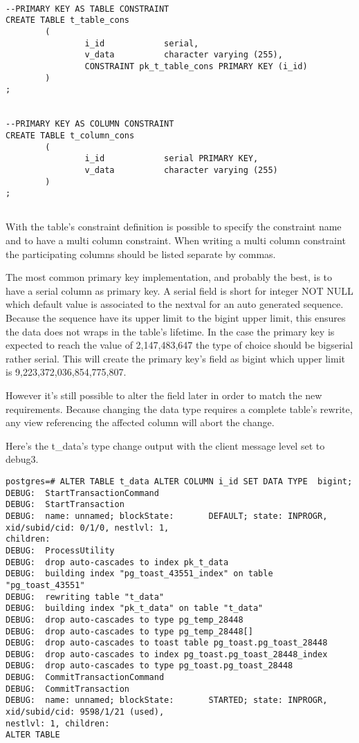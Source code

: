 \begin{lstlisting}[style=pgsql]

--PRIMARY KEY AS TABLE CONSTRAINT
CREATE TABLE t_table_cons
        (
                i_id            serial,
                v_data          character varying (255),
                CONSTRAINT pk_t_table_cons PRIMARY KEY (i_id)
        )
;


--PRIMARY KEY AS COLUMN CONSTRAINT
CREATE TABLE t_column_cons
        (
                i_id            serial PRIMARY KEY,
                v_data          character varying (255)
        )
;
 

\end{lstlisting}

With the table's constraint definition is possible to specify the constraint name and to have a 
multi column constraint. When writing a multi column constraint the participating columns should be 
listed separate by commas.\newline

The most common primary key implementation, and probably the best, is to have a serial column as 
primary key. A serial field is short for integer NOT NULL which default value is associated to the 
nextval for an auto generated sequence. Because the sequence have its upper limit to the bigint 
upper limit, this ensures the data does not wraps in the table's lifetime. In the case the primary 
key is expected to reach the value of 2,147,483,647 the type of choice should be bigserial rather 
serial. This will create the primary key's field as bigint which upper limit is 
9,223,372,036,854,775,807.\newline

However it's still possible to alter the field later in order to match the new requirements. 
Because changing the data type requires a complete table's rewrite, any view referencing the 
affected column will abort the change. \newline 

Here's the t\_data's type change output with the client message level set to debug3.

\begin{lstlisting}[style=pgsql]
postgres=# ALTER TABLE t_data ALTER COLUMN i_id SET DATA TYPE  bigint; 
DEBUG:  StartTransactionCommand
DEBUG:  StartTransaction
DEBUG:  name: unnamed; blockState:       DEFAULT; state: INPROGR, xid/subid/cid: 0/1/0, nestlvl: 1, 
children: 
DEBUG:  ProcessUtility
DEBUG:  drop auto-cascades to index pk_t_data
DEBUG:  building index "pg_toast_43551_index" on table "pg_toast_43551"
DEBUG:  rewriting table "t_data"
DEBUG:  building index "pk_t_data" on table "t_data"
DEBUG:  drop auto-cascades to type pg_temp_28448
DEBUG:  drop auto-cascades to type pg_temp_28448[]
DEBUG:  drop auto-cascades to toast table pg_toast.pg_toast_28448
DEBUG:  drop auto-cascades to index pg_toast.pg_toast_28448_index
DEBUG:  drop auto-cascades to type pg_toast.pg_toast_28448
DEBUG:  CommitTransactionCommand
DEBUG:  CommitTransaction
DEBUG:  name: unnamed; blockState:       STARTED; state: INPROGR, xid/subid/cid: 9598/1/21 (used), 
nestlvl: 1, children: 
ALTER TABLE

\end{lstlisting}


